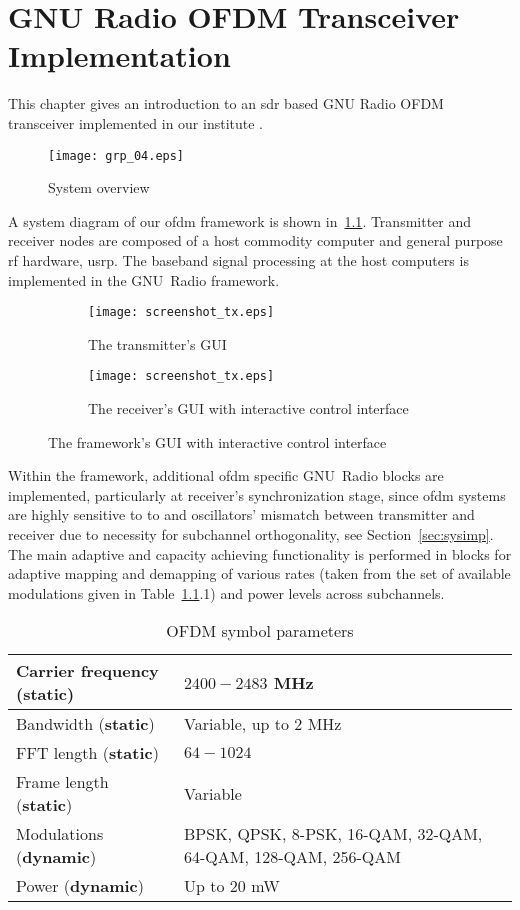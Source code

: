 \chapter{GNU Radio OFDM Transceiver Implementation}\label{sec:TIOFDM}%
%
This chapter gives an introduction to an \gls{sdr} based GNU Radio OFDM transceiver implemented in our institute \cite{MZDARM}.
%
\begin{figure}[thb]
\centering
\texttt{[image: grp\_04.eps]}
\caption{System overview\label{fig:sys_dig}}
\end{figure}
%
A system diagram of our \gls{ofdm} framework is shown in~\cref{fig:sys_dig}. Transmitter and receiver nodes are composed of a host commodity computer and general purpose \gls{rf} hardware, \gls{usrp}. The baseband signal processing at the host computers is implemented in the GNU~Radio framework.
%
\begin{figure}[ht]
\centering

 \begin{subfigure}[b]{0.56\linewidth}
 \centering
 \texttt{[image: screenshot\_tx.eps]}
 \caption{The transmitter's GUI}\label{fig:txgui}
 \end{subfigure}

 \begin{subfigure}[b]{0.56\linewidth}
 \centering
 \texttt{[image: screenshot\_tx.eps]}
 \caption{The receiver's GUI with interactive control interface}\label{fig:rxgui}
 \end{subfigure}
\caption{The framework's GUI with interactive control interface\label{fig:txrxgui}}
\end{figure}%
%
Within the framework, additional \gls{ofdm} specific GNU~Radio blocks are implemented, particularly at receiver's synchronization stage, since \gls{ofdm} systems are highly sensitive to \gls{to} and oscillators' mismatch between transmitter and receiver due to necessity for subchannel orthogonality, see Section~\ref{sec:sysimp}. The main adaptive and capacity achieving functionality is performed in blocks for adaptive mapping and demapping of various rates (taken from the set of available modulations given in Table~\ref{tab:tabtab}.1) and power levels across subchannels.
%
\begin{table}[tb]
\label{tab:tabtab}
\centering
{\scriptsize\begin{tabular}{| p{4.5cm}| p{5.5cm}|}\hline
Carrier frequency (\textbf{static})&$2400-2483$ MHz\\\hline
Bandwidth (\textbf{static})& Variable, up to $2$ MHz\\\hline
FFT length (\textbf{static})& $64-1024$\\\hline
Frame length (\textbf{static}) & Variable \\\hline
Modulations (\textbf{dynamic})&BPSK, QPSK, 8-PSK, 16-QAM, 32-QAM, 64-QAM, 128-QAM, 256-QAM\\\hline
Power (\textbf{dynamic})& Up to 20 mW\\\hline
\end{tabular} }%
\caption{OFDM symbol parameters}%
\end{table}%
